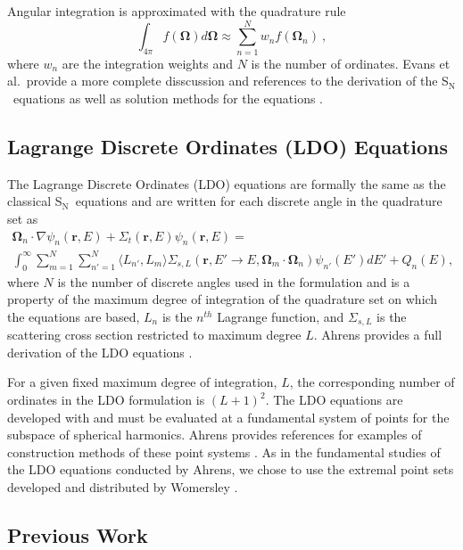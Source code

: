 \documentclass{article} %
\newcommand{\bo}{\mathbf\Omega}
\newcommand{\vecr}{\textbf{r}}
\newcommand{\sn}{S$_\mathrm{N}$}
\begin{document}
Angular integration is approximated with the quadrature rule 
%
\begin{equation}
\int_{4\pi} f\left(\bo\right) d\bo \approx \sum_{n=1}^{N}w_n f\left(\bo_n\right)\:,
\label{eq:quadrule}
\end{equation}
%
where $w_n$ are the integration weights and $N$ is the number of ordinates.
Evans et al.\ provide a more complete disscussion and references to the
derivation of the \sn\ equations as well as solution methods for the equations
\cite{denovo}.

\subsection{Lagrange Discrete Ordinates (LDO) Equations}

The Lagrange Discrete Ordinates (LDO) equations are formally the same as the
classical \sn\ equations and are written for each discrete angle in the quadrature
set as
%
\begin{multline}
\bo_n\cdot\nabla\psi_{n}(\vecr,E) + 
\Sigma_{t}(\vecr,E)\psi_{n}(\vecr,E) = \\
\int_0^\infty\sum_{m=1}^{N}\sum_{n'=1}^{N}\langle L_{n'},L_{m}\rangle
\Sigma_{s,L}(\vecr,E'\rightarrow E,\bo_{m}\cdot\bo_n)\psi_{n'}(E')dE'
+ Q_{n}(E),
\end{multline}
%
where $N$ is the number of discrete angles used in the formulation
and is a property of the maximum degree of integration of the quadrature set
on which the equations are based, $L_n$ is the $n^{th}$ Lagrange function, and
$\Sigma_{s,L}$ is the scattering cross section restricted to maximum degree
$L$. Ahrens provides a full derivation of the LDO equations \cite{ahrens}.

For a given fixed maximum degree of integration, $L$, the corresponding number
of ordinates in the LDO formulation is $(L+1)^2$. The LDO equations are
developed with and must be evaluated at a fundamental system of points for the
subspace of spherical harmonics. Ahrens provides references for examples of
construction methods of these point systems \cite{ahrens}. As in the
fundamental studies of the LDO equations conducted by Ahrens, we chose to use
the extremal point sets developed and distributed by Womersley \cite{wom}.

\subsection{Previous Work}
\end{document}
